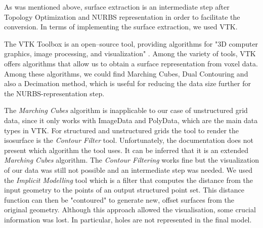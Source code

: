 As was mentioned above, surface extraction is an intermediate step after Topology Optimization and NURBS representation in order to facilitate the conversion. In terms of implementing the surface extraction, we used VTK.




The VTK Toolbox is an open--source tool, providing algorithms for "3D computer graphics, image processing, and visualization" \cite{VTKToolbox}. Among the variety of tools, VTK offers algorithms that allow us to obtain a surface representation from voxel data. Among these algorithms, we could find Marching Cubes, Dual Contouring and also a Decimation method, which is useful for reducing the data size further for the NURBS-representation step.


The \textit{Marching Cubes} algorithm is inapplicable to our case of unstructured grid data, since it only works with ImageData and PolyData, which are the main data types in VTK. For structured and unstructured grids the tool to render the isosurface is the \textit{Contour Filter} tool. Unfortunately, the documentation does not present which algorithm the tool uses. It can be inferred that it is an extended \textit{Marching Cubes} algorithm.
The \textit{Contour Filtering} works fine but the visualization of our data was still not possible
and an intermediate step was needed. We used the \textit{Implicit Modelling} tool which is a filter that
computes the distance from the input geometry to the points of an output structured point set.
This distance function can then be "contoured" to generate new, offset surfaces from the original
geometry. Although this approach allowed the visualisation, some crucial information was lost. In particular, holes are not represented in the final model.  


